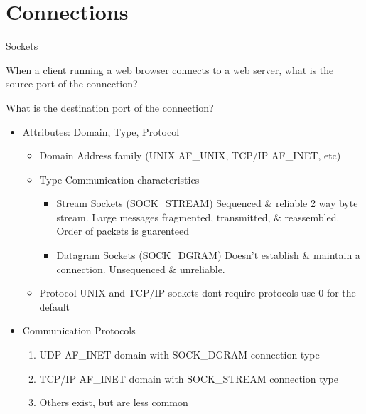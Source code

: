 \section{Connections}
\begin{questions}{Sockets}

		When a client running a web browser connects to a web server, what is the source port of the connection?

		What is the destination port of the connection?

	\begin{questionAnswer}
	\end{questionAnswer}

	\begin{itemize}
		\item Attributes: Domain, Type, Protocol
			\begin{itemize}
				\item Domain \ra Address family (UNIX \ra AF\_UNIX, TCP/IP \ra AF\_INET, etc)
				\item Type \ra Communication characteristics
					\begin{itemize}
						\item Stream Sockets (SOCK\_STREAM) \ra Sequenced \& reliable 2 way byte stream. Large messages fragmented, transmitted, \& reassembled. Order of packets is guarenteed
						\item Datagram Sockets (SOCK\_DGRAM) \ra Doesn't establish \& maintain a connection. Unsequenced \& unreliable.
					\end{itemize}
				\item Protocol \ra UNIX and TCP/IP sockets dont require protocols \ra use 0 for the default
			\end{itemize}
		\item Communication Protocols
			\begin{enumerate}
				\item UDP \ra AF\_INET domain with SOCK\_DGRAM connection type
				\item TCP/IP \ra AF\_INET domain with SOCK\_STREAM connection type
				\item Others exist, but are less common
			\end{enumerate}
	\end{itemize}
\end{questions}

